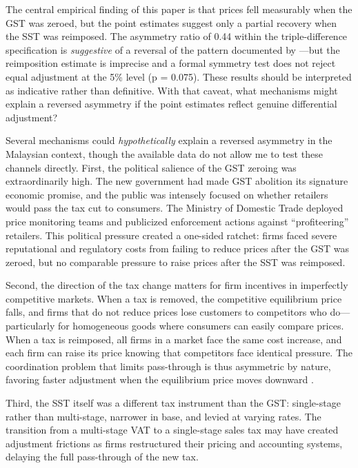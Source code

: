 \documentclass[12pt]{article}
\begin{document}
The central empirical finding of this paper is that prices fell measurably when the GST was zeroed, but the point estimates suggest only a partial recovery when the SST was reimposed. The asymmetry ratio of 0.44 within the triple-difference specification is \emph{suggestive} of a reversal of the pattern documented by \citet{peltzman2000}---but the reimposition estimate is imprecise and a formal symmetry test does not reject equal adjustment at the 5\% level (p = 0.075). These results should be interpreted as indicative rather than definitive. With that caveat, what mechanisms might explain a reversed asymmetry if the point estimates reflect genuine differential adjustment?

Several mechanisms could \emph{hypothetically} explain a reversed asymmetry in the Malaysian context, though the available data do not allow me to test these channels directly. First, the political salience of the GST zeroing was extraordinarily high. The new government had made GST abolition its signature economic promise, and the public was intensely focused on whether retailers would pass the tax cut to consumers. The Ministry of Domestic Trade deployed price monitoring teams and publicized enforcement actions against ``profiteering'' retailers. This political pressure created a one-sided ratchet: firms faced severe reputational and regulatory costs from failing to reduce prices after the GST was zeroed, but no comparable pressure to raise prices after the SST was reimposed.

Second, the direction of the tax change matters for firm incentives in imperfectly competitive markets. When a tax is removed, the competitive equilibrium price falls, and firms that do not reduce prices lose customers to competitors who do---particularly for homogeneous goods where consumers can easily compare prices. When a tax is reimposed, all firms in a market face the same cost increase, and each firm can raise its price knowing that competitors face identical pressure. The coordination problem that limits pass-through is thus asymmetric by nature, favoring faster adjustment when the equilibrium price moves downward \citep{anderson2001, tappata2009}.

Third, the SST itself was a different tax instrument than the GST: single-stage rather than multi-stage, narrower in base, and levied at varying rates. The transition from a multi-stage VAT to a single-stage sales tax may have created adjustment frictions as firms restructured their pricing and accounting systems, delaying the full pass-through of the new tax.
\end{document}
